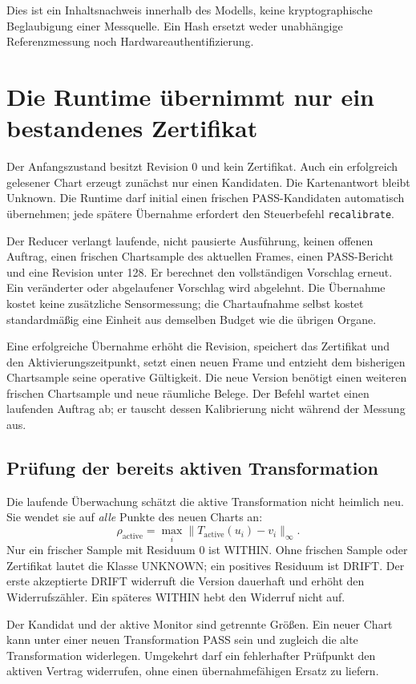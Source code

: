 \documentclass[11pt,a4paper]{article}
\newcommand{\nextsection}[2]{\clearpage{\color{accent}\small\textsf{#1}}\section{#2}}
\begin{document}
Dies ist ein Inhaltsnachweis innerhalb des Modells, keine
kryptographische Beglaubigung einer Messquelle. Ein Hash ersetzt
weder unabhängige Referenzmessung noch Hardwareauthentifizierung.

\nextsection{57 / ADOPTION UND WIDERRUF}{Die Runtime übernimmt nur ein bestandenes Zertifikat}
Der Anfangszustand besitzt Revision 0 und kein Zertifikat. Auch
ein erfolgreich gelesener Chart erzeugt zunächst nur einen
Kandidaten. Die Kartenantwort bleibt Unknown. Die Runtime darf
initial einen frischen PASS-Kandidaten automatisch übernehmen;
jede spätere Übernahme erfordert den Steuerbefehl
\texttt{recalibrate}.

Der Reducer verlangt laufende, nicht pausierte Ausführung, keinen
offenen Auftrag, einen frischen Chartsample des aktuellen Frames,
einen PASS-Bericht und eine Revision unter 128. Er berechnet den
vollständigen Vorschlag erneut. Ein veränderter oder abgelaufener
Vorschlag wird abgelehnt. Die Übernahme kostet keine zusätzliche
Sensormessung; die Chartaufnahme selbst kostet standardmäßig eine
Einheit aus demselben Budget wie die übrigen Organe.

Eine erfolgreiche Übernahme erhöht die Revision, speichert das
Zertifikat und den Aktivierungszeitpunkt, setzt einen neuen Frame
und entzieht dem bisherigen Chartsample seine operative Gültigkeit.
Die neue Version benötigt einen weiteren frischen Chartsample und
neue räumliche Belege. Der Befehl wartet einen laufenden Auftrag
ab; er tauscht dessen Kalibrierung nicht während der Messung aus.

\subsection{Prüfung der bereits aktiven Transformation}
Die laufende Überwachung schätzt die aktive Transformation nicht
heimlich neu. Sie wendet sie auf \emph{alle} Punkte des neuen Charts an:
\[
 \rho_{\mathrm{active}}=
 \max_i\lVert T_{\mathrm{active}}(u_i)-v_i\rVert_\infty.
\]
Nur ein frischer Sample mit Residuum 0 ist WITHIN.
Ohne frischen Sample oder Zertifikat lautet die Klasse UNKNOWN;
ein positives Residuum ist DRIFT. Der erste akzeptierte DRIFT
widerruft die Version dauerhaft und erhöht den Widerrufszähler.
Ein späteres WITHIN hebt den Widerruf nicht auf.

Der Kandidat und der aktive Monitor sind getrennte Größen.
Ein neuer Chart kann unter einer neuen Transformation PASS sein
und zugleich die alte Transformation widerlegen. Umgekehrt darf
ein fehlerhafter Prüfpunkt den aktiven Vertrag widerrufen, ohne
einen übernahmefähigen Ersatz zu liefern.
\end{document}
